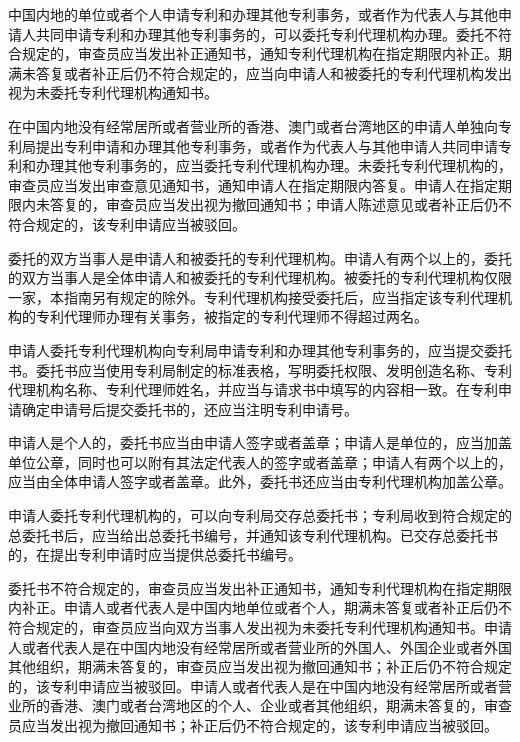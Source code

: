 中国内地的单位或者个人申请专利和办理其他专利事务，或者作为代表人与其他申请人共同申请专利和办理其他专利事务的，可以委托专利代理机构办理。委托不符合规定的，审查员应当发出补正通知书，通知专利代理机构在指定期限内补正。期满未答复或者补正后仍不符合规定的，应当向申请人和被委托的专利代理机构发出视为未委托专利代理机构通知书。

在中国内地没有经常居所或者营业所的香港、澳门或者台湾地区的申请人单独向专利局提出专利申请和办理其他专利事务，或者作为代表人与其他申请人共同申请专利和办理其他专利事务的，应当委托专利代理机构办理。未委托专利代理机构的，审查员应当发出审查意见通知书，通知申请人在指定期限内答复。申请人在指定期限内未答复的，审查员应当发出视为撤回通知书；申请人陈述意见或者补正后仍不符合规定的，该专利申请应当被驳回。

委托的双方当事人是申请人和被委托的专利代理机构。申请人有两个以上的，委托的双方当事人是全体申请人和被委托的专利代理机构。被委托的专利代理机构仅限一家，本指南另有规定的除外。专利代理机构接受委托后，应当指定该专利代理机构的专利代理师办理有关事务，被指定的专利代理师不得超过两名。

申请人委托专利代理机构向专利局申请专利和办理其他专利事务的，应当提交委托书。委托书应当使用专利局制定的标准表格，写明委托权限、发明创造名称、专利代理机构名称、专利代理师姓名，并应当与请求书中填写的内容相一致。在专利申请确定申请号后提交委托书的，还应当注明专利申请号。

申请人是个人的，委托书应当由申请人签字或者盖章；申请人是单位的，应当加盖单位公章，同时也可以附有其法定代表人的签字或者盖章；申请人有两个以上的，应当由全体申请人签字或者盖章。此外，委托书还应当由专利代理机构加盖公章。

申请人委托专利代理机构的，可以向专利局交存总委托书；专利局收到符合规定的总委托书后，应当给出总委托书编号，并通知该专利代理机构。已交存总委托书的，在提出专利申请时应当提供总委托书编号。

委托书不符合规定的，审查员应当发出补正通知书，通知专利代理机构在指定期限内补正。申请人或者代表人是中国内地单位或者个人，期满未答复或者补正后仍不符合规定的，审查员应当向双方当事人发出视为未委托专利代理机构通知书。申请人或者代表人是在中国内地没有经常居所或者营业所的外国人、外国企业或者外国其他组织，期满未答复的，审查员应当发出视为撤回通知书；补正后仍不符合规定的，该专利申请应当被驳回。申请人或者代表人是在中国内地没有经常居所或者营业所的香港、澳门或者台湾地区的个人、企业或者其他组织，期满未答复的，审查员应当发出视为撤回通知书；补正后仍不符合规定的，该专利申请应当被驳回。

